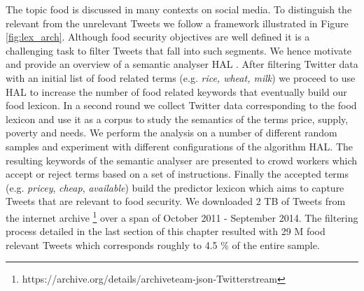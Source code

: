 The topic food is discussed in many contexts on social media. To distinguish the relevant from the unrelevant Tweets we follow a framework illustrated in Figure \ref{fig:lex_arch}. Although food security objectives are well defined it is a challenging task to filter Tweets that fall into such segments. We hence motivate and provide an overview of a semantic analyser HAL  \cite{lund96}. After filtering Twitter data with an initial list of food related terms  (e.g. \emph {rice, wheat, milk})  we proceed to use HAL to increase the number of food related keywords that eventually build our food lexicon. In a second round we collect Twitter data corresponding to the food lexicon and use it as a corpus to study the semantics of the terms price, supply, poverty and needs. We perform the analysis on a number of different random samples and experiment with different configurations of the algorithm HAL. The resulting keywords of the semantic analyser are presented to crowd workers which accept or reject terms based on a set of instructions. Finally the accepted terms (e.g. \emph{pricey}, \emph {cheap}, \emph{available}) build the predictor lexicon which aims to capture Tweets that are relevant to food security. We downloaded 2 TB of Tweets from the internet archive \footnote{https://archive.org/details/archiveteam-json-Twitterstream}  over a span of October 2011 - September 2014.  The filtering process detailed in the last section of this chapter resulted with 29 M food relevant Tweets which corresponds roughly to 4.5 \% of the entire sample.






